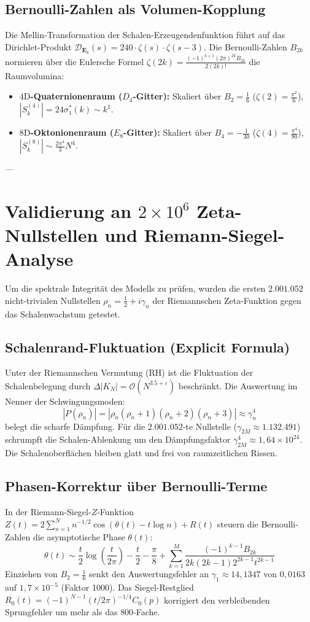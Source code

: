 \documentclass[11pt,a4paper]{article}
\begin{document}
	\subsection{Bernoulli-Zahlen als Volumen-Kopplung}
	Die Mellin-Transformation der Schalen-Erzeugendenfunktion führt auf das Dirichlet-Produkt $\mathcal{D}_{\mathbf{E}_8}(s) = 240 \cdot \zeta(s) \cdot \zeta(s-3)$. Die Bernoulli-Zahlen $B_{2k}$ normieren über die Eulersche Formel $\zeta(2k) = \frac{(-1)^{k+1} (2\pi)^{2k} B_{2k}}{2(2k)!}$ die Raumvolumina:
	\begin{itemize}
		\item \textbf{$4\text{D}$-Quaternionenraum ($D_4$-Gitter):} Skaliert über $B_2 = \frac{1}{6}$ ($\zeta(2) = \frac{\pi^2}{6}$), $|S_k^{(4)}| = 24 \sigma_1^*(k) \sim k^1$.
		\item \textbf{$8\text{D}$-Oktonionenraum ($E_8$-Gitter):} Skaliert über $B_4 = -\frac{1}{30}$ ($\zeta(4) = \frac{\pi^4}{90}$), $|S_k^{(8)}| \sim \frac{2\pi^4}{3} N^4$.
	\end{itemize}
	
	---
	
	\section{Validierung an $2 \times 10^6$ Zeta-Nullstellen und Riemann-Siegel-Analyse}
	
	Um die spektrale Integrität des Modells zu prüfen, wurden die ersten $2.001.052$ nicht-trivialen Nullstellen $\rho_n = \frac{1}{2} + i \gamma_n$ der Riemannschen Zeta-Funktion gegen das Schalenwachstum getestet.
	
	\subsection{Schalenrand-Fluktuation (Explicit Formula)}
	Unter der Riemannschen Vermutung (RH) ist die Fluktuation der Schalenbelegung durch $\Delta |K_N| = \mathcal{O}(N^{3.5 + \varepsilon})$ beschränkt. Die Auswertung im Nenner der Schwingungsmoden:
	$$|P(\rho_n)| = |\rho_n(\rho_n+1)(\rho_n+2)(\rho_n+3)| \approx \gamma_n^4$$
	belegt die scharfe Dämpfung. Für die $2.001.052$-te Nullstelle ($\gamma_{2M} \approx 1.132.491$) schrumpft die Schalen-Ablenkung um den Dämpfungsfaktor $\gamma_{2M}^4 \approx 1{,}64 \times 10^{24}$. Die Schalenoberflächen bleiben glatt und frei von raumzeitlichen Rissen.
	
	\subsection{Phasen-Korrektur über Bernoulli-Terme}
	In der Riemann-Siegel-$Z$-Funktion $Z(t) = 2 \sum_{n=1}^N n^{-1/2} \cos(\theta(t) - t \log n) + R(t)$ steuern die Bernoulli-Zahlen die asymptotische Phase $\theta(t)$:
	$$\theta(t) \sim \frac{t}{2}\log\left(\frac{t}{2\pi}\right) - \frac{t}{2} - \frac{\pi}{8} + \sum_{k=1}^{M} \frac{(-1)^{k-1} B_{2k}}{2k(2k-1) 2^{2k-1} t^{2k-1}}$$
	Einziehen von $B_2 = \frac{1}{6}$ senkt den Auswertungsfehler an $\gamma_1 \approx 14{,}1347$ von $0{,}0163$ auf $1{,}7 \times 10^{-5}$ (Faktor 1000). Das Siegel-Restglied $R_0(t) = (-1)^{N-1} (t/2\pi)^{-1/4} C_0(p)$ korrigiert den verbleibenden Sprungfehler um mehr als das $800$-Fache.
	
\end{document}
